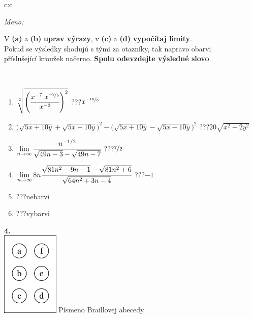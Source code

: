 \documentclass[10pt]{report}
\begin{document}
\begin{tabular}{c:c}
\begin{minipage}[c][104.5mm][t]{0.5\linewidth}
\begin{center}
\textit{Meno:}\phantom{xxxxxxxxxxxxxxxxxxxxxxxxxxxxxxxxxxxxxxxxxxxxxxxxxxxxxxxxxxxxxxxxx}\\[5mm]
\begin{minipage}{0.95\linewidth}
\begin{center}
V \textbf{(a)} a \textbf{(b)} \textbf{uprav výrazy}, v \textbf{(c)} a \textbf{(d)} \textbf{vypočítaj limity}.\\Pokud se výsledky shodujú s tými za otazníky, tak napravo obarvi\\příslušející kroužek načerno. \textbf{Spolu odevzdejte výsledné slovo}.
\end{center}
\end{minipage}
\\[1mm]
\begin{minipage}{0.79\linewidth}
\begin{center}
\begin{varwidth}{\linewidth}
\begin{enumerate}
\small
\item $\sqrt[2]{\left(\cfrac{x^{-7}\;x^{\nicefrac{-2}{5}}}{x^{-3}}\right)^{2}}$\quad \dotfill\; ???\;\dotfill \quad $x^{\nicefrac{-18}{5}}$
\item {\footnotesize{\scriptsize$\big(\sqrt{5x+10y}+\sqrt{5x-10y}\big)^2-\big(\sqrt{5x+10y}-\sqrt{5x-10y}\big)^2$}\quad \dotfill\; ???\;\dotfill \quad $20\sqrt{x^2-2y^2}$}
\item $\lim\limits_{n\to\infty}\cfrac{n^{-1/2}}{\sqrt{49n-3}-\sqrt{49n-7}}$\quad \dotfill\; ???\;\dotfill \quad $\nicefrac{7}{2}$
\item $\lim\limits_{n\to\infty}8n\cfrac{\sqrt{81n^2-9n-1}-\sqrt{81n^2+6}}{\sqrt{64n^2+3n-4}}$\quad \dotfill\; ???\;\dotfill \quad $-1$
\item \quad \dotfill\; ???\;\dotfill \quad nebarvi
\item \quad \dotfill\; ???\;\dotfill \quad vybarvi
\end{enumerate}
\end{varwidth}
\end{center}
\end{minipage}
\begin{minipage}{0.20\linewidth}
\begin{center}
{\Huge\bfseries 4.} \\[2mm]
\includegraphics[height=40mm]{../images/braille.png}
{\small Písmeno Braillovej abecedy}
\end{center}
\end{minipage}
\end{center}
\end{minipage}
%
\end{tabular}
\end{document}
